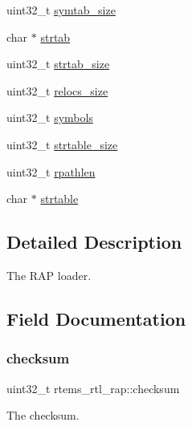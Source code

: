 \begin{DoxyCompactItemize}
\item 
uint32\+\_\+t \mbox{\hyperlink{structrtems__rtl__rap_a61fc229e1cccaf8eb5133ac148027b22}{symtab\+\_\+size}}
\item 
char $\ast$ \mbox{\hyperlink{structrtems__rtl__rap_a54673b18eea236d01c11f9c09a9d53a0}{strtab}}
\item 
uint32\+\_\+t \mbox{\hyperlink{structrtems__rtl__rap_a157202d160d54341b1ff39a8db918edd}{strtab\+\_\+size}}
\item 
uint32\+\_\+t \mbox{\hyperlink{structrtems__rtl__rap_aa89533d5e0aecc5d0fe3cda5cf94858b}{relocs\+\_\+size}}
\item 
uint32\+\_\+t \mbox{\hyperlink{structrtems__rtl__rap_a617999f1941368042e016d085a89ce8e}{symbols}}
\item 
uint32\+\_\+t \mbox{\hyperlink{structrtems__rtl__rap_a4e97ca7e6c96425a6cc7507c37f1b866}{strtable\+\_\+size}}
\item 
uint32\+\_\+t \mbox{\hyperlink{structrtems__rtl__rap_abaf47538cc4665f964be70ddf659c29a}{rpathlen}}
\item 
char $\ast$ \mbox{\hyperlink{structrtems__rtl__rap_a6a45b000db3b9327f43767f27ce448e6}{strtable}}
\end{DoxyCompactItemize}


\subsection{Detailed Description}
The R\+AP loader. 

\subsection{Field Documentation}
\mbox{\label{structrtems__rtl__rap_a957640d391fe3e812679618e27fa0472}} 
\subsubsection{\texorpdfstring{checksum}{checksum}}
{\footnotesize\ttfamily uint32\+\_\+t rtems\+\_\+rtl\+\_\+rap\+::checksum}

The checksum. \mbox{\label{structrtems__rtl__rap_a8e1d7b5713076ab83be83b0566b3a6be}} 

